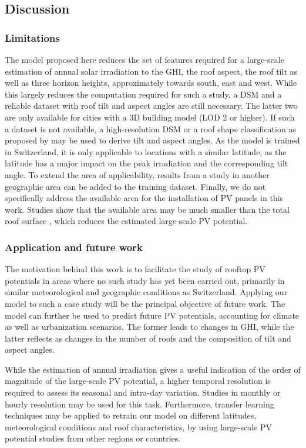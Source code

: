 \subsection{Discussion}

\subsubsection{Limitations}
The model proposed here reduces the set of features required for a large-scale estimation of annual solar irradiation to the GHI, the roof aspect, the roof tilt as well as three horizon heights, approximately towards south, east and west. While this largely reduces the computation required for such a study, a DSM and a reliable dataset with roof tilt and aspect angles are still necessary. The latter two are only available for cities with a 3D building model (LOD 2 or higher). If such a dataset is not available, a high-resolution DSM or a roof shape classification as proposed by \cite{mohajeri_city-scale_2018} may be used to derive tilt and aspect angles. As the model is trained in Switzerland, it is only applicable to locations with a similar latitude, as the latitude has a major impact on the peak irradiation and the corresponding tilt angle. To extend the area of applicability, results from a study in another geographic area can be added to the training dataset. Finally, we do not specifically address the available area for the installation of PV panels in this work. Studies show that the available area may be much smaller than the total roof surface \cite{assouline_quantifying_2017}, which reduces the estimated large-scale PV potential.

\subsubsection{Application and future work}

The motivation behind this work is to facilitate the study of rooftop PV potentials in areas where no such study has yet been carried out, primarily in similar meteorological and geographic conditions as Switzerland. Applying our model to such a case study will be the principal objective of future work. The model can further be used to predict future PV potentials, accounting for climate as well as urbanization scenarios. The former leads to changes in GHI, while the latter reflects as changes in the number of roofs and the composition of tilt and aspect angles. 

While the estimation of annual irradiation gives a useful indication of the order of magnitude of the large-scale PV potential, a higher temporal resolution is required to assess its seasonal and intra-day variation. Studies in monthly \cite{assouline_large-scale_2018} or hourly \cite{buffat_scalable_2018} resolution may be used for this task. Furthermore, transfer learning techniques may be applied to retrain our model on different latitudes, meteorological conditions and roof characteristics, by using large-scale PV potential studies from other regions or countries.


